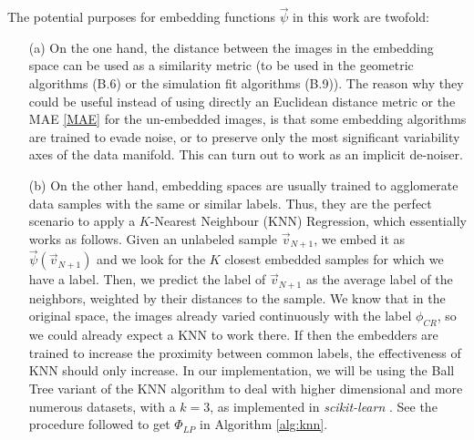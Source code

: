 \documentclass[11pt, a4paper, twoside]{article} %
\begin{document}
The potential purposes for embedding functions $\vec{\psi}$ in this work are twofold:\vspace{-0.2cm}
\begin{itemize}
\item[(a)] On the one hand, the distance between the images in the embedding space can be used as a similarity metric (to be used in the geometric algorithms (B.6) or the simulation fit algorithms (B.9)). The reason why they could be useful instead of using directly an Euclidean distance metric or the MAE \eqref{MAE} for the un-embedded images, is that some embedding algorithms are trained to evade noise, or to preserve only the most significant variability axes of the data manifold. This can turn out to work as an implicit de-noiser.\vspace{-0.1cm}

\item[(b)] On the other hand, embedding spaces are usually trained to agglomerate data samples with the same or similar labels. Thus, they are the perfect scenario to apply a $K$-Nearest Neighbour (KNN) Regression, which essentially works as follows. Given an unlabeled sample $\vec{v}_{N+1}$, we embed it as $\vec{\psi}(\vec{v}_{N+1})$ and we look for the $K$ closest embedded samples for which we have a label. Then, we predict the label of $\vec{v}_{N+1}$ as the average label of the neighbors, weighted by their distances to the sample. We know that in the original space, the images already varied continuously with the label $\phi_{CR}$, so we could already expect a KNN to work there. If then the embedders are trained to increase the proximity between common labels, the effectiveness of KNN should only increase. In our implementation, we will be using the Ball Tree \cite{balltree} variant of the KNN algorithm to deal with higher dimensional and more numerous datasets, with a $k=3$, as implemented in {\em scikit-learn} \cite{sklearn}. See the procedure followed to get $\Phi_{LP}$ in Algorithm \ref{alg:knn}.
\end{itemize}
\end{document}

